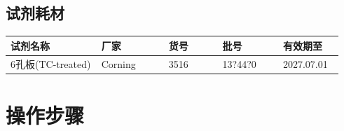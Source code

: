 \documentclass[UTF8,10pt,a4paper,fontset=fandol]{ctexart}
\newcommand{\fieldvalue}[1]{#1}
\newcommand{\handwritten}[1]{#1}
\begin{document}
\subsection{试剂耗材}

\begin{center}
\begin{tabular}{|p{0.27\linewidth}|p{0.20\linewidth}|p{0.16\linewidth}|p{0.18\linewidth}|p{0.18\linewidth}|}
\hline
试剂名称 & 厂家 & 货号 & 批号 & 有效期至\\
\hline
\fieldvalue{6孔板(TC-treated)} &
\fieldvalue{Corning} &
\fieldvalue{3516} &
\fieldvalue{\handwritten{13?44?0}} &
\fieldvalue{\handwritten{2027.07.01}}\\
\hline
\end{tabular}
\end{center}

\section{操作步骤}
\end{document}
